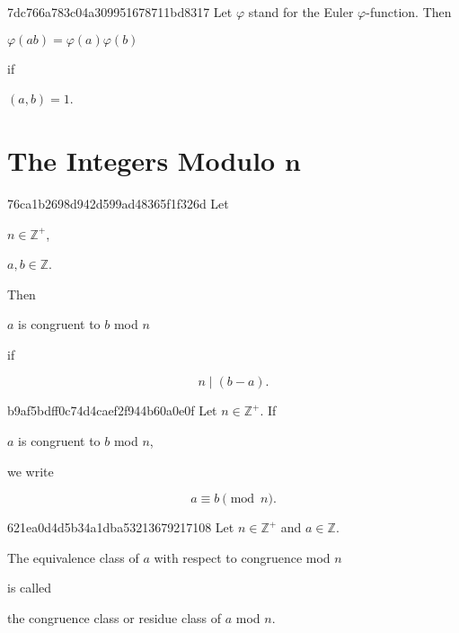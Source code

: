 \begin{note}{7dc766a783c04a309951678711bd8317}
    Let \({ \varphi }\) stand for the Euler \({ \varphi }\)-function.
    Then
    \begin{center}
        \begin{icloze}{1}\({ \varphi(ab) = \varphi(a) \varphi(b) }\)\end{icloze} \quad if \begin{icloze}{2}\({ (a, b) = 1 }\).\end{icloze}
    \end{center}
\end{note}

\section{The Integers Modulo \({ \mathbf{n} }\)}
\begin{note}{76ca1b2698d942d599ad48365f1f326d}
    Let \begin{icloze}{3}\({ n \in \mathbb Z^{+} }\),\end{icloze} \begin{icloze}{4}\({ a, b \in \mathbb Z }\).\end{icloze}
    Then \begin{icloze}{2}\({ a }\) is congruent to \({ b }\) mod \({ n }\)\end{icloze} if
    \begin{icloze}{1}
        \[
            n \mid (b - a).
        \]
    \end{icloze}
\end{note}

\begin{note}{b9af5bdff0c74d4caef2f944b60a0e0f}
    Let \({ n \in \mathbb Z^{+} }\).
    If \begin{icloze}{2}\({ a }\) is congruent to \({ b }\) mod \({ n }\),\end{icloze} we write
    \begin{icloze}{1}
        \[
            a \equiv b \pmod n.
        \]
    \end{icloze}
\end{note}

\begin{note}{621ea0d4d5b34a1dba53213679217108}
    Let \({ n \in \mathbb Z^{+} }\) and \({ a \in \mathbb Z }\).
    \begin{icloze}{1}The equivalence class of \({ a }\) with respect to congruence mod \({ n }\)\end{icloze} is called \begin{icloze}{2}the congruence class or residue class of \({ a }\) mod \({ n }\).\end{icloze}
\end{note}

